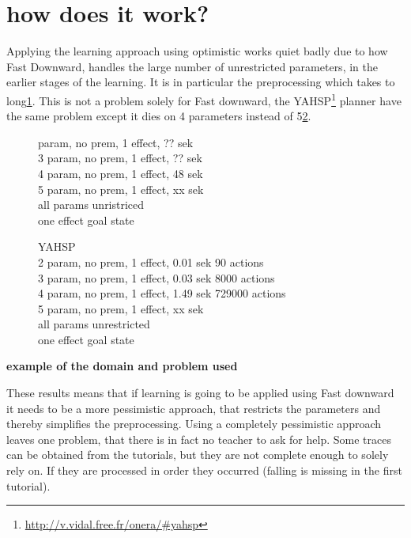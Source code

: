 \section{how does it work?}
Applying the learning approach using optimistic works quiet badly due to how Fast Downward, handles the large number of unrestricted parameters, in the earlier stages of the learning. It is in particular the preprocessing which takes to long\ref{opt-fd}. This is not a problem solely for Fast downward, the YAHSP\footnote{\url{http://v.vidal.free.fr/onera/\#yahsp}} planner have the same problem except it dies on 4 parameters instead of 5\ref{opt-ya}.
\begin{figure}
	\label{opt-fd}
	 param, no prem, 1 effect, ?? sek\\
	3 param, no prem, 1 effect, ?? sek\\
	4 param, no prem, 1 effect, 48 sek\\
	5 param, no prem, 1 effect, xx sek\\

	all params unristriced\\
	one effect goal state\\
\end{figure}
\begin{figure}

	\label{opt-ya}
	\centering
	YAHSP\\
	2 param, no prem, 1 effect, 0.01 sek 90 actions\\
	3 param, no prem, 1 effect, 0.03 sek 8000 actions\\
	4 param, no prem, 1 effect, 1.49 sek 729000 actions\\
	5 param, no prem, 1 effect, xx sek\\
	
	all params unrestricted\\
	one effect goal state\\
\end{figure}
\textbf{\huge example of the domain and problem used}

These results means that if learning is going to be applied using Fast downward it needs to be a more pessimistic approach, that restricts the parameters and thereby simplifies the preprocessing. Using a completely pessimistic approach leaves one problem, that there is in fact no teacher to ask for help. Some traces can be obtained from the tutorials, but they are not complete enough to solely rely on. If they are processed in order they occurred (falling is missing in the first tutorial).  

